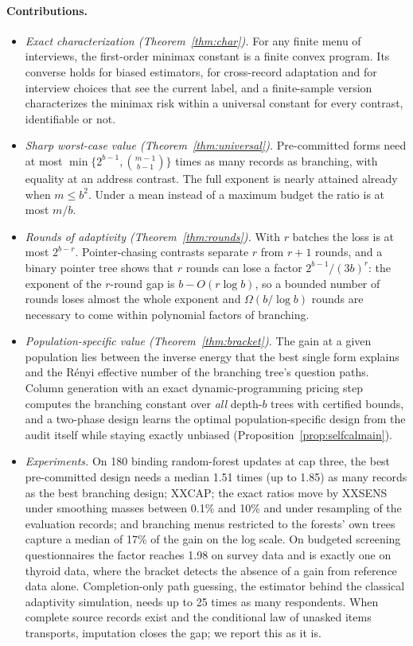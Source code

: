 \documentclass{article}
\begin{document}
\paragraph{Contributions.}
\begin{itemize}\itemsep1pt\parskip0pt
\item \emph{Exact characterization (Theorem~\ref{thm:char}).} For any finite menu of interviews, the first-order minimax constant is a finite convex program. Its converse holds for biased estimators, for cross-record adaptation and for interview choices that see the current label, and a finite-sample version characterizes the minimax risk within a universal constant for every contrast, identifiable or not.
\item \emph{Sharp worst-case value (Theorem~\ref{thm:universal}).} Pre-committed forms need at most $\min\{2^{b-1},\binom{m-1}{b-1}\}$ times as many records as branching, with equality at an address contrast. The full exponent is nearly attained already when $m\le b^2$. Under a mean instead of a maximum budget the ratio is at most $m/b$.
\item \emph{Rounds of adaptivity (Theorem~\ref{thm:rounds}).} With $r$ batches the loss is at most $2^{b-r}$. Pointer-chasing contrasts separate $r$ from $r+1$ rounds, and a binary pointer tree shows that $r$ rounds can lose a factor $2^{b-1}/(3b)^r$: the exponent of the $r$-round gap is $b-O(r\log b)$, so a bounded number of rounds loses almost the whole exponent and $\Omega(b/\log b)$ rounds are necessary to come within polynomial factors of branching.
\item \emph{Population-specific value (Theorem~\ref{thm:bracket}).} The gain at a given population lies between the inverse energy that the best single form explains and the R\'enyi effective number of the branching tree's question paths. Column generation with an exact dynamic-programming pricing step computes the branching constant over \emph{all} depth-$b$ trees with certified bounds, and a two-phase design learns the optimal population-specific design from the audit itself while staying exactly unbiased (Proposition~\ref{prop:selfcalmain}).
\item \emph{Experiments.} On 180 binding random-forest updates at cap three, the best pre-committed design needs a median 1.51 times (up to 1.85) as many records as the best branching design; XXCAP; the exact ratios move by XXSENS under smoothing masses between 0.1\% and 10\% and under resampling of the evaluation records; and branching menus restricted to the forests' own trees capture a median of 17\% of the gain on the log scale. On budgeted screening questionnaires the factor reaches 1.98 on survey data and is exactly one on thyroid data, where the bracket detects the absence of a gain from reference data alone. Completion-only path guessing, the estimator behind the classical adaptivity simulation, needs up to 25 times as many respondents. When complete source records exist and the conditional law of unasked items transports, imputation closes the gap; we report this as it is.
\end{itemize}
\end{document}
